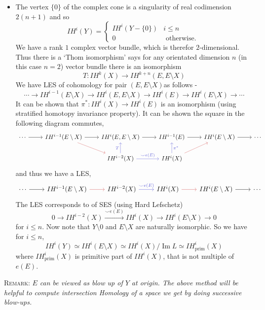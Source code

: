 \documentclass[11pt]{article}
\begin{document}
\begin{itemize}
 \item[] The vertex $\{0\}$ of the complex cone is a singularity of real codimension $2(n+1)$ and so
 $$
 I H^i(Y)=\left\{\begin{array}{cl}
 I H^i(Y-\{0\}) & i \leq n \\
 0 & \text { otherwise. }
 \end{array}\right.
 $$
 \noindent We have a rank $1$ complex vector bundle, which is therefor $2$-dimensional. Thus there is a `Thom isomorphism' says for any orientated dimension $n$ (in this case $n=2$) vector bundle there is an isomorphism $$T: IH^k(X) \rightarrow IH^ {k+n}(E, E\setminus X)$$ We have LES of cohomology for pair $(E,E\setminus X)$as follows - $$\cdots \rightarrow IH^{i-1}(E \setminus X) \rightarrow IH^i(E, E\setminus X) \rightarrow IH^i(E) \rightarrow IH^i(E\setminus X) \rightarrow \cdots $$
It can be shown that $\pi^{\ast}: IH^{i}(X)\to IH^{i}(E)$ is an isomorphism (using stratified homotopy invariance property). It can be shown the square in the following diagram commutes, \[\begin{tikzcd}
    \cdots & {IH^{i-1}(E\setminus X)} & {IH^{i}(E,E\setminus X)} & {IH^{i-1}(E)} & {IH^{i}(E\setminus X)} & \cdots \\
    && {IH^{i-2}(X)} & {IH^{i}(X)}
    \arrow[from=1-1, to=1-2]
    \arrow[from=1-2, to=1-3]
    \arrow[from=1-3, to=1-4]
    \arrow[from=1-4, to=1-5]
    \arrow[from=1-5, to=1-6]
    \arrow["{\smile e(E)}", color={rgb,255:red,92;green,92;blue,214}, from=2-3, to=2-4]
    \arrow["{\pi^{\ast}}"', color={rgb,255:red,92;green,92;blue,214}, from=2-4, to=1-4]
    \arrow["T", color={rgb,255:red,92;green,92;blue,214}, from=2-3, to=1-3]
    \arrow[color={rgb,255:red,214;green,92;blue,92}, from=1-2, to=2-3]
    \arrow[color={rgb,255:red,214;green,92;blue,92}, from=2-4, to=1-5]
    \end{tikzcd}\]
    and thus we have a LES, \[\begin{tikzcd}
        \cdots & {IH^{i-1}(E\setminus X)} & {IH^{i-2}(X)} & {IH^{i}(X)} & {IH^{i}(E\setminus X)} & \cdots
        \arrow[from=1-1, to=1-2]
        \arrow[from=1-5, to=1-6]
        \arrow[color={rgb,255:red,214;green,92;blue,92}, from=1-2, to=1-3]
        \arrow[color={rgb,255:red,214;green,92;blue,92}, from=1-4, to=1-5]
        \arrow["{\smile e(E)}", color={rgb,255:red,92;green,92;blue,214}, from=1-3, to=1-4]
        \end{tikzcd}\]
        The LES corresponds to of SES (using Hard Lefschetz) $$0\to IH^{i-2}(X)\xrightarrow{\smile e(E)}IH^{i}(X) \to IH^{i}(E\setminus X)\to 0$$ for $i \leq n$. Now note that $Y \setminus \qty{0}$ and $E \setminus X$ are naturally isomorphic. So we have for $i \leq n$, $$IH^i(Y)\simeq IH^{i}(E\setminus X) \simeq IH^{i}(X)/\operatorname{Im} L \simeq IH^{i}_{\text{prim}}(X)$$ where $IH^{i}_{\text{prim}}(X)$ is primitive part of $IH^{i}(X)$, that is not multiple of $e(E)$.
\end{itemize} \textsc{Remark:} \textit{$E$ can be viewed as blow up of $Y$ at origin. The above method will be helpful to compute intersection Homology of a space we get by doing successive blow-ups.}







  \printbibliography[ 
        heading=bibintoc,
        title={Bibliography}
    ]
\end{document}
